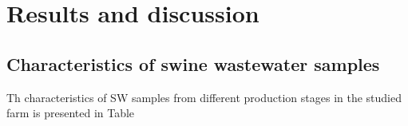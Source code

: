 \section{Results and discussion}
\subsection{Characteristics of swine wastewater samples}
Th characteristics of SW samples from different production stages in the studied farm is presented in Table 